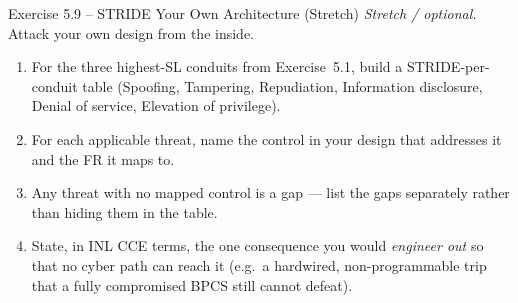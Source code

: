 \documentclass[11pt,a4paper]{article}
\begin{document}
\begin{taskbox}{Exercise 5.9 -- STRIDE Your Own Architecture (Stretch)}
\emph{Stretch / optional.} Attack your own design from the inside.
\begin{enumerate}
  \item For the three highest-SL conduits from Exercise~5.1, build a STRIDE-per-conduit table (Spoofing, Tampering, Repudiation, Information disclosure, Denial of service, Elevation of privilege).
  \item For each applicable threat, name the control in your design that addresses it and the FR it maps to.
  \item Any threat with no mapped control is a gap --- list the gaps separately rather than hiding them in the table.
  \item State, in INL CCE terms, the one consequence you would \emph{engineer out} so that no cyber path can reach it (e.g.\ a hardwired, non-programmable trip that a fully compromised BPCS still cannot defeat).
\end{enumerate}
\end{taskbox}
\end{document}
